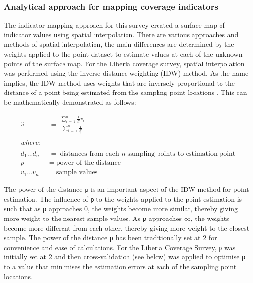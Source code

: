 \documentclass[12pt,a4paper]{article}
\begin{document}
\hypertarget{analytical-approach-for-mapping-coverage-indicators}{%
\subsubsection{Analytical approach for mapping coverage indicators}\label{analytical-approach-for-mapping-coverage-indicators}}

The indicator mapping approach for this survey created a surface map of indicator values using spatial interpolation. There are various approaches and methods of spatial interpolation, the main differences are determined by the weights applied to the point dataset to estimate values at each of the unknown points of the surface map. For the Liberia coverage survey, spatial interpolation was performed using the inverse distance weighting (IDW) method. As the name implies, the IDW method uses weights that are inversely proportional to the distance of a point being estimated from the sampling point locations \citep{Isaaks:1989uk, diggle2007mbg, diggle2013statistical}. This can be mathematically demonstrated as follows:

\[\begin{aligned}
\hat{v} & ~ = ~ \frac{\displaystyle \sum\limits_{i ~ = ~ 1} ^ {n} \frac{1}{d_{i}^{p}}v_{i}}{\displaystyle \sum\limits_{i ~ = ~ 1}^{n}\frac{1}{d_{i}^{p}}} \\
\\
where: & \\
\\
d_1 \ldots d_n & ~ = ~ \text{distances from each } n \text{ sampling points to estimation point} \\
p & ~ = ~ \text{power of the distance} \\
v_1 \ldots v_n & ~ = ~ \text{sample values}
\end{aligned}\]

The power of the distance \texttt{p} is an important aspect of the IDW method for point estimation. The influence of \texttt{p} to the weights applied to the point estimation is such that as \texttt{p} approaches 0, the weights become more similar, thereby giving more weight to the nearest sample values. As \texttt{p} approaches \(\infty\), the weights become more different from each other, thereby giving more weight to the closest sample. The power of the distance \texttt{p} has been traditionally set at 2 for convenience and ease of calculations. For the Liberia Coverage Survey, \texttt{p} was initially set at 2 and then cross-validation (see below) was applied to optimise \texttt{p} to a value that minimises the estimation errors at each of the sampling point locations.
\end{document}

